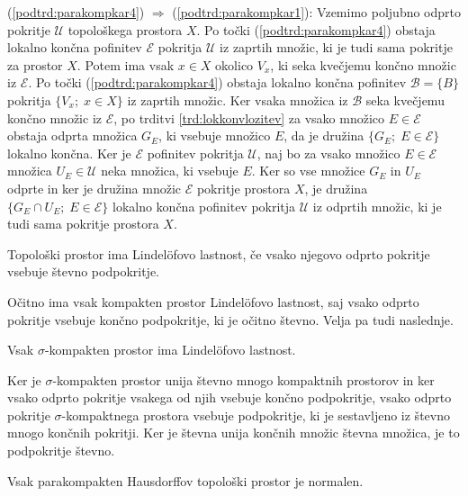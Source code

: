 \documentclass[mat1]{fmfdelo}
\newcommand{\Ucurl}{\mathcal{U}}
\begin{document}
\begin{dokaz}
(\ref{podtrd:parakompkar4}) $\Rightarrow$ (\ref{podtrd:parakompkar1}):
Vzemimo poljubno odprto pokritje $\Ucurl$ topološkega prostora $X$. Po točki (\ref{podtrd:parakompkar4}) obstaja lokalno končna pofinitev $\mathcal{E}$ pokritja $\Ucurl$ iz zaprtih množic, ki je tudi sama pokritje za prostor $X$. Potem ima vsak $x \in X$ okolico $V_x$, ki seka kvečjemu končno množic iz $\mathcal{E}$. Po točki (\ref{podtrd:parakompkar4}) obstaja lokalno končna pofinitev $\mathcal{B} = \lbrace B \rbrace$ pokritja $\lbrace V_x ;\; x \in X \rbrace$ iz zaprtih množic. Ker vsaka množica iz $\mathcal{B}$ seka kvečjemu končno množic iz $\mathcal{E}$, po trditvi \ref{trd:lokkonvlozitev} za vsako množico $E \in \mathcal{E}$ obstaja odprta množica $G_E$, ki vsebuje množico $E$, da je družina $\lbrace G_E ;\; E \in \mathcal{E} \rbrace$ lokalno končna. Ker je $\mathcal{E}$ pofinitev pokritja $\Ucurl$, naj bo za vsako množico $E \in \mathcal{E}$ množica $U_E \in \Ucurl$ neka množica, ki vsebuje $E$. Ker so vse množice $G_E$ in $U_E$ odprte in ker je družina množic $\mathcal{E}$ pokritje prostora $X$, je družina $\lbrace G_E \cap U_E ;\; E \in \mathcal{E} \rbrace$ lokalno končna pofinitev pokritja $\Ucurl$ iz odprtih množic, ki je tudi sama pokritje prostora $X$.
\end{dokaz}

\begin{definicija}
Topološki prostor ima Lindel\"ofovo lastnost, če vsako njegovo odprto pokritje vsebuje števno podpokritje.
\end{definicija}

Očitno ima vsak kompakten prostor Lindel\"ofovo lastnost, saj vsako odprto pokritje vsebuje končno podpokritje, ki je očitno števno. Velja pa tudi naslednje.
\begin{trditev}\label{trd:lindel}
Vsak $\sigma$-kompakten prostor ima Lindel\"ofovo lastnost.
\end{trditev}
\begin{dokaz}
Ker je $\sigma$-kompakten prostor unija števno mnogo kompaktnih prostorov in ker vsako odprto pokritje vsakega od njih vsebuje končno podpokritje, vsako odprto pokritje $\sigma$-kompaktnega prostora vsebuje pod\-pok\-rit\-je, ki je sestavljeno iz števno mnogo končnih pokritji. Ker je števna unija končnih množic števna množica, je to podpokritje števno.
\end{dokaz}

\begin{trditev}\label{trd:parkompnorm} %
Vsak parakompakten Hausdorffov topološki prostor je normalen.
\end{trditev}
\end{document}
